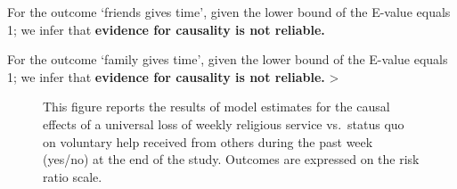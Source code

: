 \documentclass[
  single column]{article}
\begin{document}
For the outcome `friends gives time', given the lower bound of the
E-value equals 1; we infer that \textbf{evidence for causality is not
reliable.}

For the outcome `family gives time', given the lower bound of the
E-value equals 1; we infer that \textbf{evidence for causality is not
reliable.} \textgreater{}

\newpage{}

\begin{figure}


\caption{\label{fig-3_3}This figure reports the results of model
estimates for the causal effects of a universal loss of weekly religious
service vs.~status quo on voluntary help received from others during the
past week (yes/no) at the end of the study. Outcomes are expressed on
the risk ratio scale.}

\end{figure}%
\end{document}
